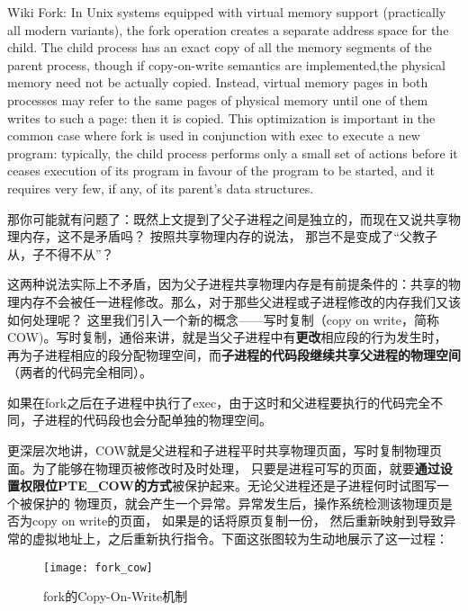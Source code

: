 \begin{note}
\small{
Wiki Fork: In Unix systems equipped with virtual memory support (practically all modern variants), the fork operation creates a separate address space
 for the child. The child process has an exact copy of all the memory segments of the parent process, though if copy-on-write semantics
 are implemented,the physical memory need not be actually copied. Instead, virtual memory pages in both processes may refer to the same pages of physical memory
 until one of them writes to such a page: then it is copied. This optimization is important in the common case where fork is used
 in conjunction with exec to execute a new program: typically, the child process performs only a small set of actions before it ceases
 execution of its program in favour of the program to be started, and it requires very few, if any, of its parent's data structures.}
\end{note}

那你可能就有问题了：既然上文提到了父子进程之间是独立的，而现在又说共享物理内存，这不是矛盾吗？
按照共享物理内存的说法， 那岂不是变成了“父教子从，子不得不从”？

这两种说法实际上不矛盾，因为父子进程共享物理内存是有前提条件的：共享的物理内存不会被任一进程修改。那么，对于那些父进程或子进程修改的内存我们又该如何处理呢？
这里我们引入一个新的概念——写时复制（copy on write，简称COW)。写时复制，通俗来讲，就是当父子进程中有\textbf{更改}相应段的行为发生时，
再为子进程相应的段分配物理空间，而\textbf{子进程的代码段继续共享父进程的物理空间}（两者的代码完全相同）。

\begin{note}
如果在fork之后在子进程中执行了exec，由于这时和父进程要执行的代码完全不同，子进程的代码段也会分配单独的物理空间。
\end{note}

更深层次地讲，COW就是父进程和子进程平时共享物理页面，写时复制物理页面。为了能够在物理页被修改时及时处理，
只要是进程可写的页面，就要\textbf{通过设置权限位PTE\_COW的方式}被保护起来。\label{页保护与处理}无论父进程还是子进程何时试图写一个被保护的
物理页，就会产生一个异常。异常发生后，操作系统检测该物理页是否为copy on write的页面， 如果是的话将原页复制一份，
然后重新映射到导致异常的虚拟地址上，之后重新执行指令。下面这张图较为生动地展示了这一过程：

\begin{figure}[htbp]
  \centering
  \texttt{[image: fork\_cow]}
  \caption{fork的Copy-On-Write机制}\label{fig:fork_cow}
\end{figure}

